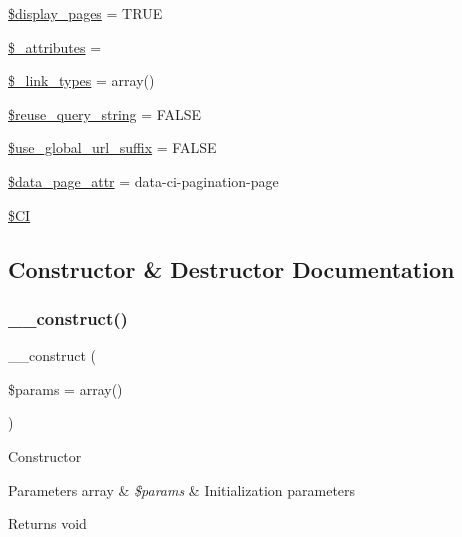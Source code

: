 \begin{DoxyCompactItemize}
\item 
\mbox{\hyperlink{class_c_i___pagination_ab68f1bc9a7442f1936286f05b7ba175d}{\$display\+\_\+pages}} = T\+R\+UE
\item 
\mbox{\hyperlink{class_c_i___pagination_a891d1c35cfe08f5bf9eb53043b78035d}{\$\+\_\+attributes}} = \textquotesingle{}\textquotesingle{}
\item 
\mbox{\hyperlink{class_c_i___pagination_a6bb16f8a41b808305d99487eaf429717}{\$\+\_\+link\+\_\+types}} = array()
\item 
\mbox{\hyperlink{class_c_i___pagination_aaca516d12ed63aa4523ab88dd46e067d}{\$reuse\+\_\+query\+\_\+string}} = F\+A\+L\+SE
\item 
\mbox{\hyperlink{class_c_i___pagination_aa2ec11ced927cd6f4e62fa19a4e35325}{\$use\+\_\+global\+\_\+url\+\_\+suffix}} = F\+A\+L\+SE
\item 
\mbox{\hyperlink{class_c_i___pagination_a3bbb05bafee2889f825aa40dcd684426}{\$data\+\_\+page\+\_\+attr}} = \textquotesingle{}data-\/ci-\/pagination-\/page\textquotesingle{}
\item 
\mbox{\hyperlink{class_c_i___pagination_ae0314d046ddf7fcfaec03222977427d3}{\$\+CI}}
\end{DoxyCompactItemize}


\subsection{Constructor \& Destructor Documentation}
\mbox{\label{class_c_i___pagination_a568ecdb0d73d2a870f33189739922a50}} 
\subsubsection{\texorpdfstring{\+\_\+\+\_\+construct()}{\_\_construct()}}
{\footnotesize\ttfamily \+\_\+\+\_\+construct (\begin{DoxyParamCaption}\item[{}]{\$params = {\ttfamily array()} }\end{DoxyParamCaption})}

Constructor


\begin{DoxyParams}[1]{Parameters}
array & {\em \$params} & Initialization parameters \\
\hline
\end{DoxyParams}
\begin{DoxyReturn}{Returns}
void 
\end{DoxyReturn}


